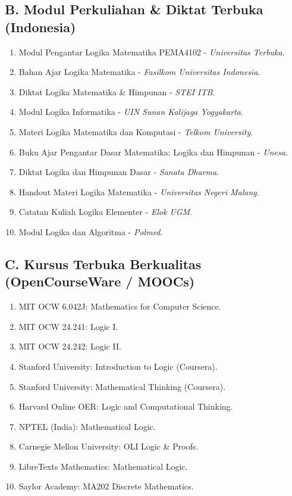 \documentclass[12pt,a4paper]{article}
\begin{document}
\subsection*{B. Modul Perkuliahan \& Diktat Terbuka (Indonesia)}
\begin{enumerate}[leftmargin=*, label={B\arabic*.}]
  \item Modul Pengantar Logika Matematika PEMA4102 - \textit{Universitas Terbuka}.
  \item Bahan Ajar Logika Matematika - \textit{Fasilkom Universitas Indonesia}.
  \item Diktat Logika Matematika \& Himpunan - \textit{STEI ITB}.
  \item Modul Logika Informatika - \textit{UIN Sunan Kalijaga Yogyakarta}.
  \item Materi Logika Matematika dan Komputasi - \textit{Telkom University}.
  \item Buku Ajar Pengantar Dasar Matematika: Logika dan Himpunan - \textit{Unesa}.
  \item Diktat Logika dan Himpunan Dasar - \textit{Sanata Dharma}.
  \item Handout Materi Logika Matematika - \textit{Universitas Negeri Malang}.
  \item Catatan Kuliah Logika Elementer - \textit{Elok UGM}.
  \item Modul Logika dan Algoritma - \textit{Polmed}.
\end{enumerate}

\subsection*{C. Kursus Terbuka Berkualitas (OpenCourseWare / MOOCs)}
\begin{enumerate}[leftmargin=*, label={C\arabic*.}]
  \item MIT OCW 6.042J: Mathematics for Computer Science.
  \item MIT OCW 24.241: Logic I.
  \item MIT OCW 24.242: Logic II.
  \item Stanford University: Introduction to Logic (Coursera).
  \item Stanford University: Mathematical Thinking (Coursera).
  \item Harvard Online OER: Logic and Computational Thinking.
  \item NPTEL (India): Mathematical Logic.
  \item Carnegie Mellon University: OLI Logic \& Proofs.
  \item LibreTexts Mathematics: Mathematical Logic.
  \item Saylor Academy: MA202 Discrete Mathematics.
\end{enumerate}
\end{document}
